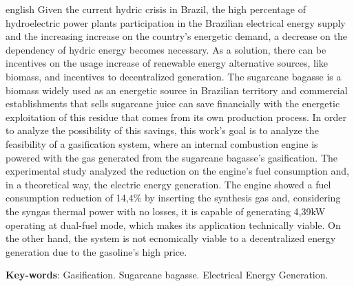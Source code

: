 \begin{resumo}[Abstract]
 \begin{otherlanguage*}{english}
Given the current hydric crisis in Brazil, the high percentage of hydroelectric power plants participation in the Brazilian electrical energy supply and the increasing increase on the country’s energetic demand, a decrease on the dependency of hydric energy becomes necessary. As a solution, there can be incentives on the usage increase of renewable energy alternative sources, like biomass, and incentives to decentralized generation. The sugarcane bagasse is a biomass widely used as an energetic source in Brazilian territory and commercial establishments that sells sugarcane juice can save financially with the energetic exploitation of this residue that comes from its own production process. In order to analyze the possibility of this savings, this work's goal is to analyze the feasibility of a gasification system, where an internal combustion engine is powered with the gas generated from the sugarcane bagasse's gasification. The experimental study analyzed the reduction on the engine's fuel consumption  and, in a theoretical way, the electric energy generation. The engine showed a fuel consumption reduction of 14,4\% by inserting the synthesis gas and, considering the syngas thermal power with no losses, it is capable of generating 4,39kW operating at dual-fuel mode, which makes its application technically viable. On the other hand, the system is not ecnomically viable to a decentralized energy generation due to the gasoline's high price.

   \vspace{\onelineskip}
 
   \noindent 
   \textbf{Key-words}: Gasification. Sugarcane bagasse. Electrical Energy Generation.
 \end{otherlanguage*}
\end{resumo}
